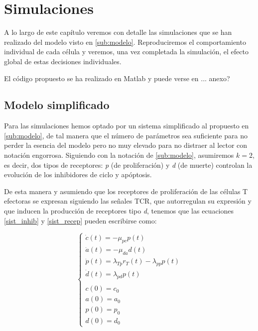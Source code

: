 
\chapter{Simulaciones}
\label{cap:simulaciones}

A lo largo de este capítulo veremos con detalle las simulaciones que se han realizado del modelo visto en \ref{sub:modelo}. Reproduciremos el comportamiento individual de cada célula y veremos, una vez completada la simulación, el efecto global de estas decisiones individuales.

El código propuesto se ha realizado en Matlab y puede verse en ... anexo? 


\section{Modelo simplificado}

Para las simulaciones hemos optado por un sistema simplificado al propuesto en \ref{sub:modelo}, de tal manera que el número de parámetros sea suficiente para no perder la esencia del modelo pero no muy elevado para no distraer al lector con notación engorrosa. Siguiendo con la notación de \ref{sub:modelo}, asumiremos $k=2$, es decir, dos tipos de receptores: \textit{p} (de proliferación) y \textit{d} (de muerte) controlan
la evolución de los inhibidores de ciclo y apóptosis.

De esta manera y asumiendo que los receptores de proliferación de las células T efectoras se expresan siguiendo las señales TCR, que autorregulan su expresión y que inducen la producción de receptores tipo \textit{d}, tenemos que las ecuaciones \ref{sist_inhib} y \ref{sist_recep} pueden escribirse como:

\begin{equation}
	\label{sist9_simplif}
	\left\{ \begin{array}{l}
	\dot{c}(t) = -\mu_{pc}p(t) \\
	\dot{a}(t) = -\mu_{da}d(t)  \\
	\dot{p}(t) = \lambda_{Tp}r_{T}(t) - \lambda_{pp}p(t) \\
	\dot{d}(t) = \lambda_{pd}p(t) \\
	\\
	c(0)=c_0 \\
	a(0)=a_0 \\
	p(0)=p_0 \\
	d(0)=d_0 
	\end{array}
	\right.
\end{equation}

